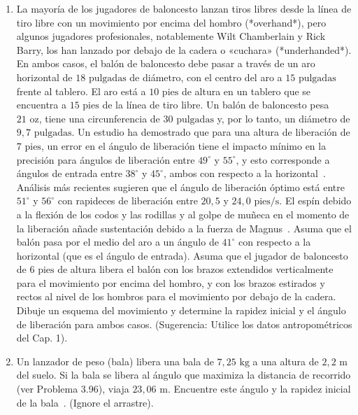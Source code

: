 \documentclass[12pt]{book}
\begin{document}
\begin{enumerate}
\item[3.117] La mayoría de los jugadores de baloncesto lanzan tiros libres desde la línea de tiro libre con un movimiento por encima del hombro (*overhand*), pero algunos jugadores profesionales, notablemente Wilt Chamberlain y Rick Barry, los han lanzado por debajo de la cadera o «cuchara» (*underhanded*). En ambos casos, el balón de baloncesto debe pasar a través de un aro horizontal de $18\text{ pulgadas}$ de diámetro, con el centro del aro a $15\text{ pulgadas}$ frente al tablero. El aro está a $10\text{ pies}$ de altura en un tablero que se encuentra a $15\text{ pies}$ de la línea de tiro libre. Un balón de baloncesto pesa $21\text{ oz}$, tiene una circunferencia de $30\text{ pulgadas}$ y, por lo tanto, un diámetro de $9{,}7\text{ pulgadas}$. Un estudio ha demostrado que para una altura de liberación de $7\text{ pies}$, un error en el ángulo de liberación tiene el impacto mínimo en la precisión para ángulos de liberación entre $49^\circ$ y $55^\circ$, y esto corresponde a ángulos de entrada entre $38^\circ$ y $45^\circ$, ambos con respecto a la horizontal~\cite{ref66,ref77}. Análisis más recientes sugieren que el ángulo de liberación óptimo está entre $51^\circ$ y $56^\circ$ con rapideces de liberación entre $20{,}5$ y $24{,}0\text{ pies/s}$. El espín debido a la flexión de los codos y las rodillas y al golpe de muñeca en el momento de la liberación añade sustentación debido a la fuerza de Magnus~\cite{ref66}. Asuma que el balón pasa por el medio del aro a un ángulo de $41^\circ$ con respecto a la horizontal (que es el ángulo de entrada). Asuma que el jugador de baloncesto de $6\text{ pies}$ de altura libera el balón con los brazos extendidos verticalmente para el movimiento por encima del hombro, y con los brazos estirados y rectos al nivel de los hombros para el movimiento por debajo de la cadera. Dibuje un esquema del movimiento y determine la rapidez inicial y el ángulo de liberación para ambos casos. (Sugerencia: Utilice los datos antropométricos del Cap. 1).

\item[3.118] Un lanzador de peso (bala) libera una bala de $7{,}25\text{ kg}$ a una altura de $2{,}2\text{ m}$ del suelo. Si la bala se libera al ángulo que maximiza la distancia de recorrido (ver Problema 3.96), viaja $23{,}06\text{ m}$. Encuentre este ángulo y la rapidez inicial de la bala~\cite{ref90}. (Ignore el arrastre).


\end{enumerate}
\end{document}
